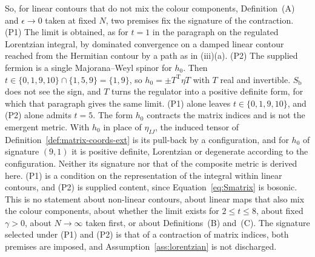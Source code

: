 So, for linear contours that do not mix the colour components, Definition~(A) and \(\epsilon\to0\) taken at fixed \(N\), two premises fix the signature of the contraction. (P1) The limit is obtained, as for \(t=1\) in the paragraph on the regulated Lorentzian integral, by dominated convergence on a damped linear contour reached from the Hermitian contour by a path as in (iii)(a). (P2) The supplied fermion is a single Majorana--Weyl spinor for \(h_0\). Then \(t\in\{0,1,9,10\}\cap\{1,5,9\}=\{1,9\}\), so \(h_0=\pm T^{\mathrm T}\eta T\) with \(T\) real and invertible. \(S_{\mathrm b}\) does not see the sign, and \(T\) turns the regulator into a positive definite form, for which that paragraph gives the same limit. (P1) alone leaves \(t\in\{0,1,9,10\}\), and (P2) alone admits \(t=5\). The form \(h_0\) contracts the matrix indices and is not the emergent metric. With \(h_0\) in place of \(\eta_{IJ}\), the induced tensor of Definition~\ref{def:matrix-coords-ext} is its pull-back by a configuration, and for \(h_0\) of signature \((9,1)\) it is positive definite, Lorentzian or degenerate according to the configuration. Neither its signature nor that of the composite metric is derived here. (P1) is a condition on the representation of the integral within linear contours, and (P2) is supplied content, since Equation~\eqref{eq:Smatrix} is bosonic. This is no statement about non-linear contours, about linear maps that also mix the colour components, about whether the limit exists for \(2\le t\le8\), about fixed \(\gamma>0\), about \(N\to\infty\) taken first, or about Definitions~(B) and~(C). The signature selected under (P1) and (P2) is that of a contraction of matrix indices, both premises are imposed, and Assumption~\ref{ass:lorentzian} is not discharged.
